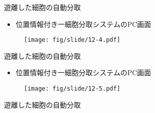 \begin{frame}[noframenumbering]{遊離した細胞の自動分取}
    \begin{itemize}
        \item 位置情報付き一細胞分取システムのPC画面
    \end{itemize}
    \begin{figure}[t]
        \centering
        \texttt{[image: fig/slide/12-4.pdf]}
    \end{figure}
\end{frame}
\begin{frame}[noframenumbering]{遊離した細胞の自動分取}
    \begin{itemize}
        \item 位置情報付き一細胞分取システムのPC画面
    \end{itemize}
    \begin{figure}[t]
        \centering
        \texttt{[image: fig/slide/12-5.pdf]}
    \end{figure}
\end{frame}
\begin{frame}[noframenumbering]{遊離した細胞の自動分取}
    \begin{figure}
    \end{figure}
\end{frame}
